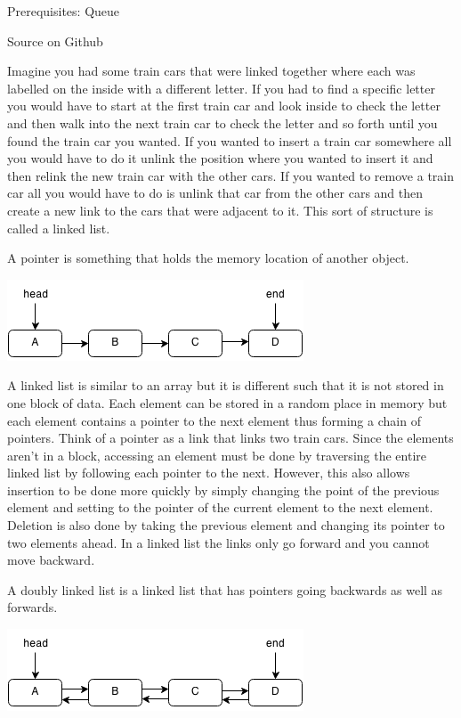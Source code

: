 \documentclass[11pt,oneside]{book}
\makeatletter
\def\maxwidth#1{\ifdim\Gin@nat@width>#1 #1\else\Gin@nat@width\fi}
\makeatother
\begin{document}
Prerequisites: Queue

Source on Github

Imagine you had some train cars that were linked together where each was labelled on the inside with a different letter. If you had to find a specific letter you would have to start at the first train car and look inside to check the letter and then walk into the next train car to check the letter and so forth until you found the train car you wanted. If you wanted to insert a train car somewhere all you would have to do it unlink the position where you wanted to insert it and then relink the new train car with the other cars. If you wanted to remove a train car all you would have to do is unlink that car from the other cars and then create a new link to the cars that were adjacent to it. This sort of structure is called a linked list.

A pointer is something that holds the memory location of another object.

\includegraphics[width=\maxwidth{\textwidth}]{linkedlist.png}

A linked list is similar to an array but it is different such that it is not stored in one block of data. Each element can be stored in a random place in memory but each element contains a pointer to the next element thus forming a chain of pointers. Think of a pointer as a link that links two train cars. Since the elements aren't in a block, accessing an element must be done by traversing the entire linked list by following each pointer to the next. However, this also allows insertion to be done more quickly by simply changing the point of the previous element and setting to the pointer of the current element to the next element. Deletion is also done by taking the previous element and changing its pointer to two elements ahead. In a linked list the links only go forward and you cannot move backward.

A doubly linked list is a linked list that has pointers going backwards as well as forwards.

\includegraphics[width=\maxwidth{\textwidth}]{doublelinkedlist.png}
\end{document}
